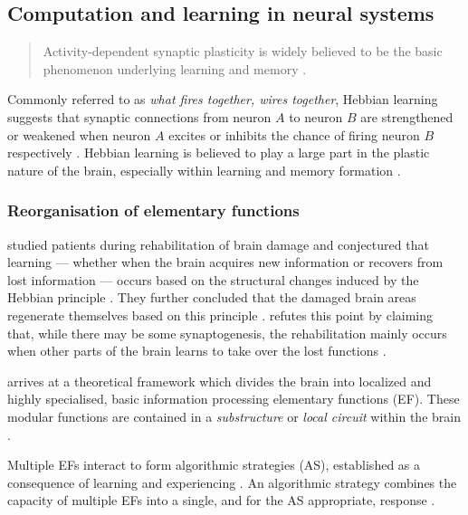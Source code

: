 \documentclass[a4paper,oneside]{memoir}
\begin{document}
\subsection{Computation and learning in neural systems}
\begin{quote}
  Activity-dependent synaptic plasticity is widely believed to be the basic
  phenomenon underlying learning and memory \autocite{dayan2001}.
\end{quote}

Commonly referred to as \textit{what fires together, wires together}, Hebbian
learning suggests that synaptic connections from neuron $A$ to neuron $B$
are strengthened or weakened when neuron $A$ excites or inhibits the chance of
firing neuron $B$ respectively \autocite{dayan2001}.
Hebbian learning is believed to play a large part in the plastic nature of the
brain, especially within learning and memory formation
\autocite{dayan2001, Johnston2009, Robertson1999}.


\subsubsection{Reorganisation of elementary functions}
\label{ref}

\autocite{Robertson1999} studied patients during
rehabilitation of brain damage and conjectured that learning --- whether when the
brain acquires new information or recovers from lost information --- occurs based
on the structural changes induced by the Hebbian principle
\autocite{Robertson1999}. They further concluded that the damaged brain areas
regenerate themselves based on this principle \autocite{Robertson1999}.
\autocite{Mogensen2011} refutes this point by claiming that, while there
may be some synaptogenesis, the rehabilitation mainly occurs when other parts
of the brain learns to take over the lost functions \autocite{Mogensen2011}.

\autocite{Mogensen2011} arrives at a theoretical framework which divides the
brain into localized and highly specialised, basic information
processing elementary functions (EF). These modular functions are contained
in a \textit{substructure} or \textit{local circuit}
within the brain \autocite{Mogensen2011}.

Multiple EFs interact to form algorithmic strategies (AS), established as
a consequence of learning and experiencing \autocite{Mogensen2011}. An
algorithmic strategy combines the capacity of multiple EFs into a single, and
for the AS appropriate, response \autocite{Mogensen2011, Mogensen2012b}.
\end{document}

